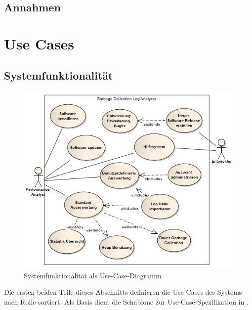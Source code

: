 \subsection{Annahmen}


\section{Use Cases}\label{use_cases}
\subsection{Systemfunktionalität}\label{systemfunktionalitaet}
 \begin{figure}[H]
  	\centering
    	\includegraphics[width=15cm]{images/anforderungen_use-case}
        	\caption{Systemfunktionalität als Use-Case-Diagramm}
\end{figure}
Die ersten beiden Teile dieses Abschnitts definieren die Use Cases des Systems nach Rolle sortiert. Als Basis dient die Schablone zur Use-Case-Spezifikation in \cite[S. 78-79]{pohl2010basiswissen}.





